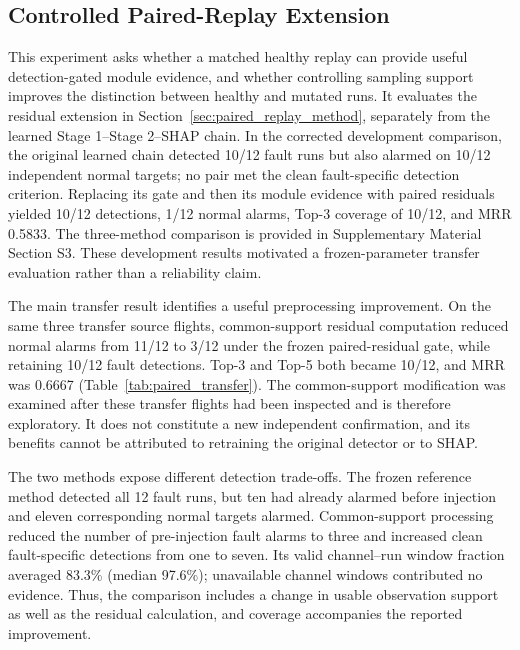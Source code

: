 \subsection{Controlled Paired-Replay Extension}
\label{sec:paired_replay_results}

This experiment asks whether a matched healthy replay can provide useful detection-gated module evidence, and whether controlling sampling support improves the distinction between healthy and mutated runs. It evaluates the residual extension in Section~\ref{sec:paired_replay_method}, separately from the learned Stage 1--Stage 2--SHAP chain. In the corrected development comparison, the original learned chain detected 10/12 fault runs but also alarmed on 10/12 independent normal targets; no pair met the clean fault-specific detection criterion. Replacing its gate and then its module evidence with paired residuals yielded 10/12 detections, 1/12 normal alarms, Top-3 coverage of 10/12, and MRR 0.5833. The three-method comparison is provided in Supplementary Material Section S3. These development results motivated a frozen-parameter transfer evaluation rather than a reliability claim.

The main transfer result identifies a useful preprocessing improvement. On the same three transfer source flights, common-support residual computation reduced normal alarms from 11/12 to 3/12 under the frozen paired-residual gate, while retaining 10/12 fault detections. Top-3 and Top-5 both became 10/12, and MRR was 0.6667 (Table~\ref{tab:paired_transfer}). The common-support modification was examined after these transfer flights had been inspected and is therefore exploratory. It does not constitute a new independent confirmation, and its benefits cannot be attributed to retraining the original detector or to SHAP.



The two methods expose different detection trade-offs. The frozen reference method detected all 12 fault runs, but ten had already alarmed before injection and eleven corresponding normal targets alarmed. Common-support processing reduced the number of pre-injection fault alarms to three and increased clean fault-specific detections from one to seven. Its valid channel--run window fraction averaged 83.3\% (median 97.6\%); unavailable channel windows contributed no evidence. Thus, the comparison includes a change in usable observation support as well as the residual calculation, and coverage accompanies the reported improvement.

